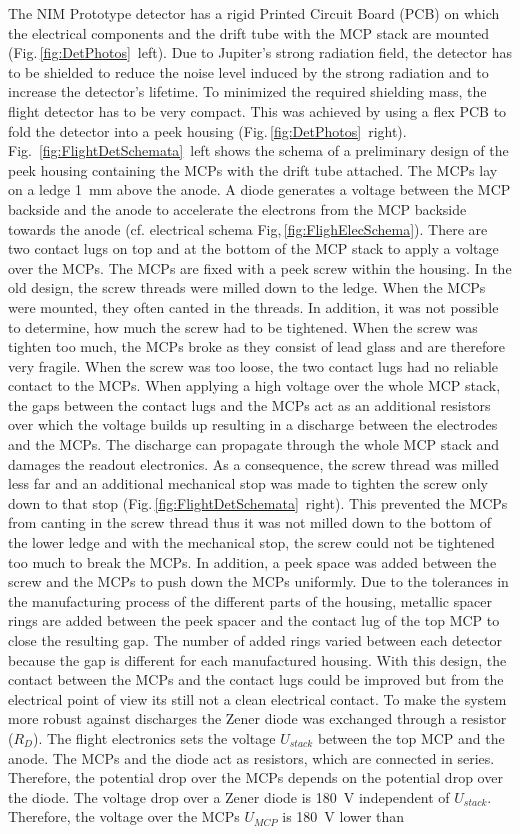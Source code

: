 		The NIM Prototype detector has a rigid Printed Circuit Board (PCB) on which the electrical components and the drift tube with the MCP stack are mounted (Fig.\,\ref{fig:DetPhotos}~left). Due to Jupiter's strong radiation field, the detector has to be shielded to reduce the noise level induced by the strong radiation and to increase the detector's lifetime. To minimized the required shielding mass, the flight detector has to be very compact. This was achieved by using a flex PCB to fold the detector into a peek housing (Fig.\,\ref{fig:DetPhotos}~right). Fig.~\ref{fig:FlightDetSchemata}~left shows the schema of a preliminary design of the peek housing containing the MCPs with the drift tube attached. The MCPs lay on a ledge 1~mm above the anode. A diode generates a voltage between the MCP backside and the anode to accelerate the electrons from the MCP backside towards the anode (cf. electrical schema Fig,\,\ref{fig:FlighElecSchema}). There are two contact lugs on top and at the bottom of the MCP stack to apply a voltage over the MCPs. The MCPs are fixed with a peek screw within the housing. In the old design, the screw threads were milled down to the ledge. When the MCPs were mounted, they often canted in the threads. In addition, it was not possible to determine, how much the screw had to be tightened. When the screw was tighten too much, the MCPs broke as they consist of lead glass and are therefore very fragile. When the screw was too loose, the two contact lugs had no reliable contact to the MCPs. When applying a high voltage over the whole MCP stack, the gaps between the contact lugs and the MCPs act as an additional resistors over which the voltage builds up resulting in a discharge between the electrodes and the MCPs. The discharge can propagate through the whole MCP stack and damages the readout electronics. As a consequence, the screw thread was milled less far and an additional mechanical stop was made to tighten the screw only down to that stop (Fig.\,\ref{fig:FlightDetSchemata}~right). This prevented the MCPs from canting in the screw thread thus it was not milled down to the bottom of the lower ledge and with the mechanical stop, the screw could not be tightened too much to break the MCPs. In addition, a peek space was added between the screw and the MCPs to push down the MCPs uniformly. Due to the tolerances in the manufacturing process of the different parts of the housing, metallic spacer rings are added between the peek spacer and the contact lug of the top MCP to close the resulting gap. The number of added rings varied between each detector because the gap is different for each manufactured housing. With this design, the contact between the MCPs and the contact lugs could be improved but from the electrical point of view its still not a clean electrical contact. To make the system more robust against discharges the Zener diode was exchanged through a resistor ($R_D$). The flight electronics sets the voltage $U_{stack}$ between the top MCP and the anode. The MCPs and the diode act as resistors, which are connected in series. Therefore, the potential drop over the MCPs depends on the potential drop over the diode. The voltage drop over a Zener diode is 180~V independent of $U_{stack}$. Therefore, the voltage over the MCPs $U_{MCP}$ is 180~V lower than 